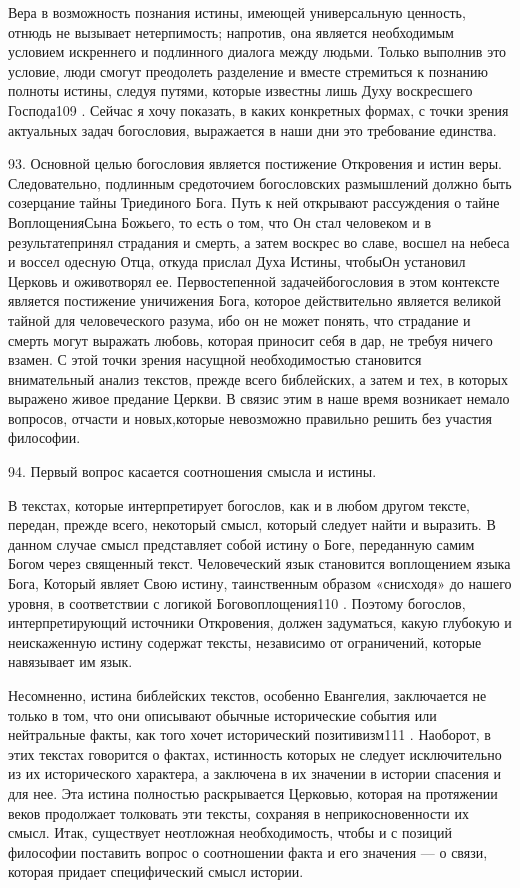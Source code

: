 \documentclass[a5paper,10pt]{article}
\begin{document}
Вера в возможность познания истины, имеющей универсальную ценность, отнюдь не
вызывает нетерпимость; напротив, она является необходимым условием искреннего и
подлинного диалога между людьми. Только выполнив это условие, люди смогут
преодолеть разделение и вместе стремиться к познанию полноты истины, следуя
путями, которые известны лишь Духу воскресшего Господа109 . Сейчас я хочу
показать, в каких конкретных формах, с точки зрения актуальных задач
богословия, выражается в наши дни это требование единства.

93. Основной целью богословия является постижение Откровения и истин веры.
Следовательно, подлинным средоточием богословских размышлений должно быть
созерцание тайны Триединого Бога. Путь к ней открывают рассуждения о тайне
ВоплощенияСына Божьего, то есть о том, что Он стал человеком и в
результатепринял страдания и смерть, а затем воскрес во славе, восшел на небеса
и воссел одесную Отца, откуда прислал Духа Истины, чтобыОн установил Церковь и
оживотворял ее. Первостепенной задачейбогословия в этом контексте является
постижение уничижения Бога, которое действительно является великой тайной для
человеческого разума, ибо он не может понять, что страдание и смерть могут
выражать любовь, которая приносит себя в дар, не требуя ничего взамен. С этой
точки зрения насущной необходимостью становится внимательный анализ текстов,
прежде всего библейских, а затем и тех, в которых выражено живое предание
Церкви. В связис этим в наше время возникает немало вопросов, отчасти и
новых,которые невозможно правильно решить без участия философии.

94. Первый вопрос касается соотношения смысла и истины.

В текстах, которые интерпретирует богослов, как и в любом другом тексте,
передан, прежде всего, некоторый смысл, который следует найти и выразить. В
данном случае смысл представляет собой истину о Боге, переданную самим Богом
через священный текст. Человеческий язык становится воплощением языка Бога,
Который являет Свою истину, таинственным образом «снисходя» до нашего уровня, в
соответствии с логикой Боговоплощения110 . Поэтому богослов, интерпретирующий
источники Откровения, должен задуматься, какую глубокую и неискаженную истину
содержат тексты, независимо от ограничений, которые навязывает им язык.

Несомненно, истина библейских текстов, особенно Евангелия, заключается не
только в том, что они описывают обычные исторические события или нейтральные
факты, как того хочет исторический позитивизм111 . Наоборот, в этих текстах
говорится о фактах, истинность которых не следует исключительно из их
исторического характера, а заключена в их значении в истории спасения и для
нее. Эта истина полностью раскрывается Церковью, которая на протяжении веков
продолжает толковать эти тексты, сохраняя в неприкосновенности их смысл. Итак,
существует неотложная необходимость, чтобы и с позиций философии поставить
вопрос о соотношении факта и его значения — о связи, которая придает
специфический смысл истории.
\end{document}
